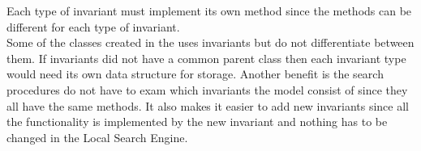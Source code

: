 Each type of invariant must implement its own method since the methods can be different for each type of invariant. \\ 
Some of the classes created in the  uses invariants but do not differentiate between them. 
If invariants did not have a common parent class then each invariant type would need its own data structure for 
storage. Another benefit is the search procedures do not have to exam which invariants the model consist of since they 
all have the same methods. It also makes it easier to add new invariants since all the functionality is implemented by 
the new invariant and nothing has to be changed in the Local Search Engine. \\ 
 

